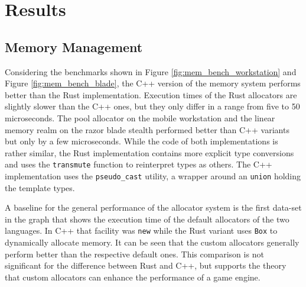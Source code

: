 \clearpage

\section{Results}

\subsection{Memory Management}

Considering the benchmarks shown in Figure \ref{fig:mem_bench_workstation} and Figure \ref{fig:mem_bench_blade}, the C++ version of the memory system performs better than the Rust implementation. Execution times of the Rust allocators are slightly slower than the C++ ones, but they only differ in a range from five to 50 microseconds. The pool allocator on the mobile workstation and the linear memory realm on the razor blade stealth performed better than C++ variants but only by a few microseconds. While the code of both implementations is rather similar, the Rust implementation contains more explicit type conversions and uses the \texttt{transmute} function to reinterpret types as others. The C++ implementation uses the \texttt{pseudo\_cast} utility, a wrapper around an \texttt{union} holding the template types. 

A baseline for the general performance of the allocator system is the first data-set in the graph that shows the execution time of the default allocators of the two languages. In C++ that facility was \texttt{new} while the Rust variant uses \texttt{Box} to dynamically allocate memory. It can be seen that the custom allocators generally perform better than the respective default ones. This comparison is not significant for the difference between Rust and C++, but supports the theory that custom allocators can enhance the performance of a game engine.

